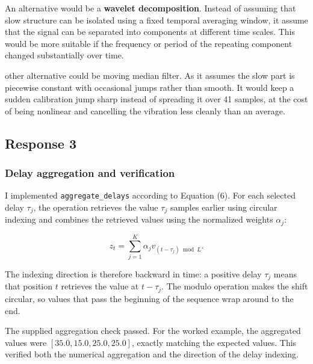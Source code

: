 \documentclass[a4, 12pt]{article}
\begin{document}
An alternative would be a \textbf{wavelet decomposition}. Instead of assuming
that slow structure can be isolated using a fixed temporal averaging window,
it assume that the signal can be separated into components at different
time scales. This would be more suitable if the frequency or period of the
repeating component changed substantially over time.

other alternative could be moving median filter. As it assumes the slow part is piecewise constant with occasional jumps rather than smooth. It would keep a sudden calibration jump sharp instead of spreading it over 41 samples, at the cost of being nonlinear and cancelling the vibration less cleanly than an average.

\subsection {Response 3}

\subsubsection*{Delay aggregation and verification}

I implemented \texttt{aggregate\_delays} according to Equation (6). For each selected
delay $\tau_j$, the operation retrieves the value $\tau_j$ samples earlier using
circular indexing and combines the retrieved values using the normalized weights
$\alpha_j$:

\begin{equation}
z_t =
\sum_{j=1}^{K}
\alpha_j v_{(t-\tau_j)\bmod L}.
\end{equation}

The indexing direction is therefore backward in time: a positive delay $\tau_j$
means that position $t$ retrieves the value at $t-\tau_j$. The modulo operation
makes the shift circular, so values that pass the beginning of the sequence wrap
around to the end.

The supplied aggregation check passed. For the worked example, the aggregated
values were $[35.0,15.0,25.0,25.0]$, exactly matching the expected values.
This verified both the numerical aggregation and the direction of the delay
indexing.
\end{document}
